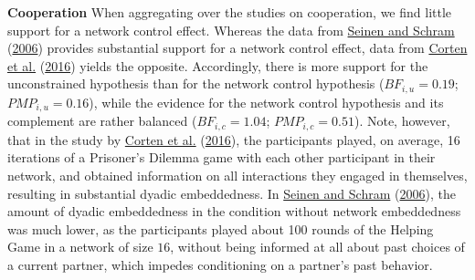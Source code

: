 \documentclass[
  11pt,
]{article}
\begin{document}
\textbf{Cooperation} \hspace{8pt}When aggregating over the studies on cooperation, we find little support for a network control effect.
Whereas the data from \protect\hyperlink{ref-seinen_schram_social_2006}{Seinen and Schram} (\protect\hyperlink{ref-seinen_schram_social_2006}{2006}) provides substantial support for a network control effect, data from \protect\hyperlink{ref-corten_etal_reputation_2016}{Corten et al.} (\protect\hyperlink{ref-corten_etal_reputation_2016}{2016}) yields the opposite.
Accordingly, there is more support for the unconstrained hypothesis than for the network control hypothesis (\(BF_{i,u} = 0.19\); \(PMP_{i,u} = 0.16\)), while the evidence for the network control hypothesis and its complement are rather balanced (\(BF_{i,c} = 1.04\); \(PMP_{i,c} = 0.51\)).
Note, however, that in the study by \protect\hyperlink{ref-corten_etal_reputation_2016}{Corten et al.} (\protect\hyperlink{ref-corten_etal_reputation_2016}{2016}), the participants played, on average, 16 iterations of a Prisoner's Dilemma game with each other participant in their network, and obtained information on all interactions they engaged in themselves, resulting in substantial dyadic embeddedness.
In \protect\hyperlink{ref-seinen_schram_social_2006}{Seinen and Schram} (\protect\hyperlink{ref-seinen_schram_social_2006}{2006}), the amount of dyadic embeddedness in the condition without network embeddedness was much lower, as the participants played about 100 rounds of the Helping Game in a network of size \(16\), without being informed at all about past choices of a current partner, which impedes conditioning on a partner's past behavior.
\end{document}
